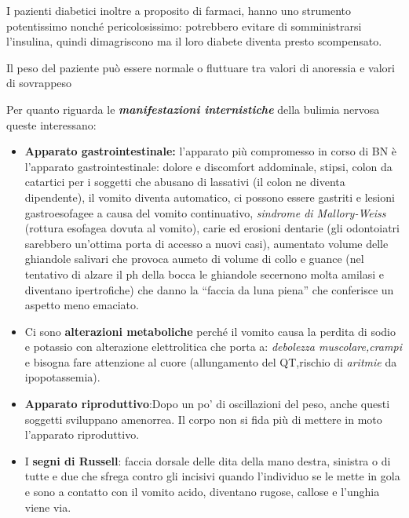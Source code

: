 I pazienti diabetici inoltre a proposito di farmaci, hanno uno strumento
potentissimo nonché pericolosissimo: potrebbero evitare di
somministrarsi l'insulina, quindi dimagriscono ma il loro diabete
diventa presto scompensato.

Il peso del paziente può essere normale o fluttuare tra valori di
anoressia e valori di sovrappeso

Per quanto riguarda le \textbf{\emph{manifestazioni internistiche}}
della bulimia nervosa queste interessano:

\begin{itemize}
\item
  \textbf{Apparato gastrointestinale:} l'apparato più compromesso in
  corso di BN è l'apparato gastrointestinale: dolore e discomfort
  addominale, stipsi, colon da catartici per i soggetti che abusano di
  lassativi (il colon ne diventa dipendente), il vomito diventa
  automatico, ci possono essere gastriti e lesioni gastroesofagee a
  causa del vomito continuativo, \emph{sindrome di Mallory-Weiss}
  (rottura esofagea dovuta al vomito), carie ed erosioni dentarie (gli
  odontoiatri sarebbero un'ottima porta di accesso a nuovi casi),
  aumentato volume delle ghiandole salivari che provoca aumeto di volume
  di collo e guance (nel tentativo di alzare il ph della bocca le
  ghiandole secernono molta amilasi e diventano ipertrofiche) che danno
  la ``faccia da luna piena'' che conferisce un aspetto meno emaciato.
\end{itemize}

\begin{itemize}
\item
  Ci sono \textbf{alterazioni metaboliche} perché il vomito causa la
  perdita di sodio e potassio con alterazione elettrolitica che porta a:
  \emph{debolezza muscolare,crampi} e bisogna fare attenzione al cuore
  (allungamento del QT,rischio di \emph{aritmie} da ipopotassemia).
\item
  \textbf{Apparato riproduttivo}:Dopo un po' di oscillazioni del peso,
  anche questi soggetti sviluppano amenorrea. Il corpo non si fida più
  di mettere in moto l'apparato riproduttivo.
\item
  I \textbf{segni di Russell}: faccia dorsale delle dita della mano
  destra, sinistra o di tutte e due che sfrega contro gli incisivi
  quando l'individuo se le mette in gola e sono a contatto con il vomito
  acido, diventano rugose, callose e l'unghia viene via.
\end{itemize}

